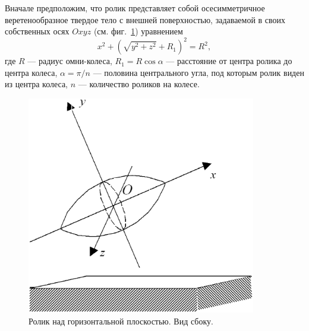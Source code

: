 

\label{sec3}
Вначале предположим, что ролик представляет собой осесимметричное 
веретенообразное твердое тело с внешней поверхностью, задаваемой в своих 
собственных осях $Oxyz$ (см. фиг.~\ref{Roller}) уравнением
\begin{equation}
x^2+\left(\sqrt{y^2+z^2}+R_1\right) ^2=R^2,
\label{3_1}
\end{equation}
где $R$ --- радиус омни-колеса, $R_1=R\cos{\alpha }$ --- расстояние от центра
ролика до центра колеса, $\alpha =\pi /n$ --- половина центрального угла, под
которым ролик виден из центра колеса, $n$ --- количество роликов на колесе.

\begin{figure}[htb]
\centering\includegraphics[width=10cm]{content/parts/3_friction/nd/Roller.eps}
\caption{Ролик над горизонтальной плоскостью. Вид сбоку.}
\label{Roller}
\end{figure}


